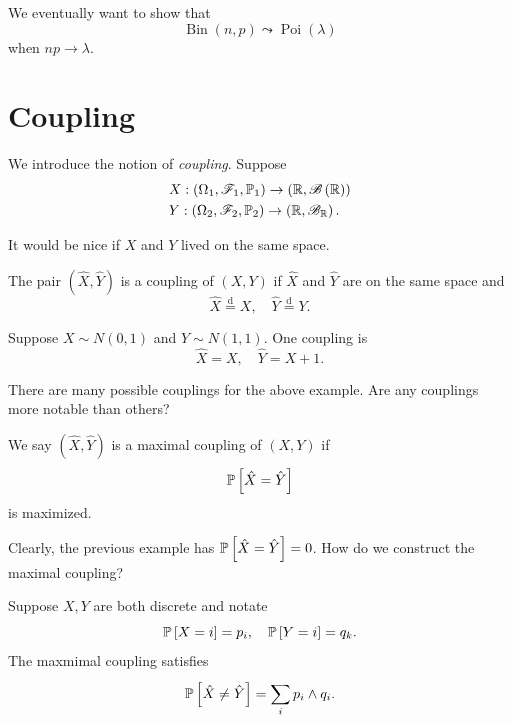 
We eventually want to show that \[
	\operatorname{Bin}\left( n,p \right) \leadsto \operatorname{Poi}(\lambda)
\] when $np \to \lambda$.

\section{Coupling}

We introduce the notion of \emph{coupling}. Suppose 
\begin{align*}
	&X: (\Omega_1, \mathscr{F}_1, \P_1) \to \left( \R,\mathscr{B}\left( \R \right) \right) \\
	&Y: (\Omega_2, \mathscr{F}_2, \P_2) \to \left( \R, \mathscr{B}_\R \right)
.\end{align*}

It would be nice if $X$ and $Y$ lived on the same space.

\begin{definition}[Coupling]
	The pair $\left( \hat{X}, \hat{Y} \right)$ is a coupling of $(X,Y)$ if $\hat{X}$ and $\hat{Y}$ are on the same space and \[
		\hat{X} \overset{\text{d}}{=} X, \quad \hat{Y} \overset{\text{d}}{=}Y
	.\] 
\end{definition}

\begin{example}
	Suppose $X \sim N(0,1)$ and $Y \sim N(1,1)$. One coupling is \[
		\hat{X} = X, \quad \hat{Y} = X+1
	.\] 
\end{example}

There are many possible couplings for the above example. Are any couplings more notable than others?

\begin{definition}
	We say $(\hat{X},\hat{Y})$ is a maximal coupling of $(X,Y)$ if \[
		\P\left[\hat{X} = \hat{Y}\right] 
	\] is maximized.
\end{definition}
Clearly, the previous example has $\P\left[\hat{X} = \hat{Y}\right] = 0 $. How do we construct the maximal coupling?

\begin{theorem}
	Suppose $X,Y$ are both discrete and notate \[
		\P\left[X = i\right] = p_i, \quad \P\left[Y = i\right]  = q_k
	.\] 
	The maxmimal coupling satisfies \[
		\P\left[\hat{X} \ne \hat{Y}\right] = \sum\limits_{i}^{} p_i \wedge q_i
	.\] 
\end{theorem}

